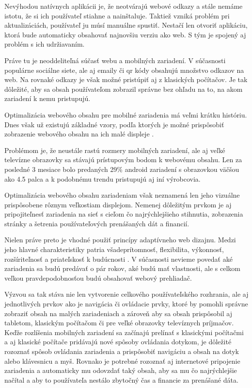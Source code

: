 Nevýhodou natívnych aplikácii je, že neotvárajú webové odkazy a stále nemáme istotu, že si ich používateľ stiahne a nainštaluje. Taktiež vzniká problém pri aktualizáciách, používateľ ju músí manuálne spustiť. Nestačí len otvoriť aplikáciu, ktorá bude automaticky obsahovať najnovšiu verziu ako web. S tým je spojený aj problém s ich udržiavaním.

Práve tu je neoddeliteľná súčasť webu a mobilných zariadení. V súčasnosti populárne sociálne siete, ale aj emaily či qr kódy obsahujú množstvo odkazov na web. Na rovnaké odkazy je však možné pristúpiť aj z klasických počítačov. Je tak dôležité, aby sa obsah používateľom zobrazil správne bez ohľadu na to, na akom zariadení k nemu pristupujú.

Optimalizácia webového obsahu pre mobilné zariadenia má veľmi krátku históriu. Dnes však už existujú základné vzory, podľa ktorých je možné prispôsobiť zobrazenie webového obsahu na ich malé displeje \cite{mobilebookpatterns, navigation}. 

Problémom je, že neustále rastú rozmery mobilných zariadení, ale aj veľké televízne obrazovky sa stávajú prístupovým bodom k webovému obsahu. Len za posledné 3 mesiace bolo predaných 29\% android zariadení s obrazovkou väčšou ako 4.5 palca \cite{bigscreen} a k podobnému trendu pristupujú aj iní výrobcovia.

Optimalizácia webového obsahu zariadeniam však neznamená len jeho vizuálne prispôsobene rôznym veľkostiam displejom. Nemenej dôležitým prvkom je aj pripojiteľnesť zariadenia na sieť s cieľom čo najrýchlejšieho stihnutia, zobrazenia stránky a šetrenia používateľových prenášaných dát a financií.

Nielen práve preto je vhodné použiť princípy adaptívneho web dizajnu. Medzi jeho hlavné charakteristiky patria všadeprítomnosť, flexibilita, výkonnosť, rozšíriteľnosť a priateľskosť k budúcnosti \cite{adaptive}. V súčasnosti nevieme povedať aké zariadenia sa budú predávať o pár rokov, aké budú mať vlastnosti, ale s celkom veľkou pravdepodobnosťou budú obsahovať webový prehliadač. 

Výzvou sa tak stáva nie len vytvorenie celkového používateľského rozhrania, ale aj jednotlivých prvkov ako je navigácia či ovládacie prvky, ktoré by pomohli správne zobraziť obsah na malých zariadeniach a zároveň aby sa obsah prispôsobil aj tabletom, klasickým počítačom či pre veľké obrazovky televíznych príjmačov. Keďže rozlíšenia mobilných zariadení sa začínajú prelínať s klasickými počítačmi a aj klasické počítače pridávajú nové spôsoby ovládania dotykom, je dôležité rozoznať spôsob ovládania zariadenia a prispôsobiť navigáciu a obsah na dotyk alebo klávesnicu a myš. Rovnako je potrebné rozoznať aj internetové pripojenie zariadenia a automaticky mu odovzdať taký obsah, aby sa mu čo najrýchlejšie načítal a aby to používateľa nestálo zbytočný čas a financie za prenášané dáta.



